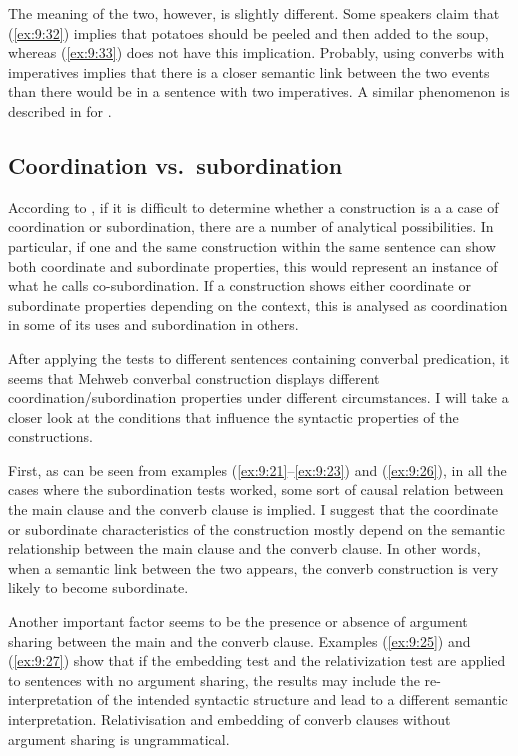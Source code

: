 ﻿\documentclass[output=paper]{langsci/langscibook}
\begin{document}
The meaning of the two, however, is slightly different. Some speakers
claim that (\ref{ex:9:32}) implies that potatoes should be peeled and then added to
the soup, whereas (\ref{ex:9:33}) does not have this implication. Probably, using
converbs with imperatives implies that there is a closer semantic link
between the two events than there would be in a sentence with two
imperatives. A similar phenomenon is described in \citet{dobrushina2008}
for .
%


\subsection{Coordination vs.\ subordination}

According to \citet{creissels2010}, if it is difficult to determine 
whether a construction is a a case of coordination or 
subordination, there are a number of analytical possibilities. In
particular, if one and the same construction within the same sentence
can show both coordinate and subordinate properties, this would
represent an instance of what he calls co-subordination. If a
construction shows either coordinate or subordinate properties
depending on the context, this is analysed as coordination in some of
its uses and subordination in others.

After applying the tests to different sentences containing converbal
predication, it seems that Mehweb converbal construction displays
different coordination/subordination properties under different
circumstances. I will take a closer look at the conditions that
influence the syntactic properties of the constructions.

First, as can be seen from examples (\ref{ex:9:21}–\ref{ex:9:23}) and (\ref{ex:9:26}), in all the
cases where the subordination tests worked, some sort of causal relation
between the main clause and the converb clause is implied. I suggest that the
coordinate or subordinate characteristics of the construction mostly
depend on the semantic relationship between the main clause and the converb
clause. In other words, when a semantic link between the two appears,
the converb construction is very likely to become subordinate.

Another important factor seems to be the presence or absence of argument sharing
between the main and the converb clause. Examples (\ref{ex:9:25}) and (\ref{ex:9:27}) show
that if the embedding test and the relativization test are applied to
sentences with no argument sharing, the results may include the
re-interpretation of the intended syntactic structure and lead to a
different semantic interpretation. Relativisation and embedding of
converb clauses without argument sharing is ungrammatical.
\end{document}
